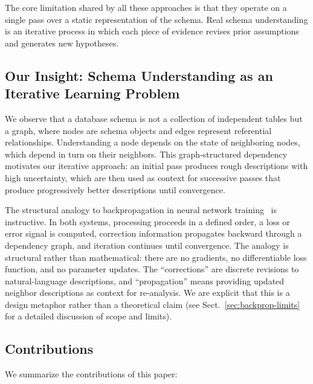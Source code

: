 \documentclass[twocolumn]{svjour3}
\begin{document}
The core limitation shared by all these approaches is that they operate on a single pass over a static representation of the schema. Real schema understanding is an iterative process in which each piece of evidence revises prior assumptions and generates new hypotheses.

\subsection{Our Insight: Schema Understanding as an Iterative Learning Problem}

We observe that a database schema is not a collection of independent tables but a graph, where nodes are schema objects and edges represent referential relationships. Understanding a node depends on the state of neighboring nodes, which depend in turn on their neighbors. This graph-structured dependency motivates our iterative approach: an initial pass produces rough descriptions with high uncertainty, which are then used as context for successive passes that produce progressively better descriptions until convergence.

The structural analogy to backpropagation in neural network training~\cite{rumelhart1986backprop} is instructive. In both systems, processing proceeds in a defined order, a loss or error signal is computed, correction information propagates backward through a dependency graph, and iteration continues until convergence. The analogy is structural rather than mathematical: there are no gradients, no differentiable loss function, and no parameter updates. The ``corrections'' are discrete revisions to natural-language descriptions, and ``propagation'' means providing updated neighbor descriptions as context for re-analysis. We are explicit that this is a design metaphor rather than a theoretical claim (see Sect.~\ref{sec:backprop-limits} for a detailed discussion of scope and limits).

\subsection{Contributions}

We summarize the contributions of this paper:
\end{document}
